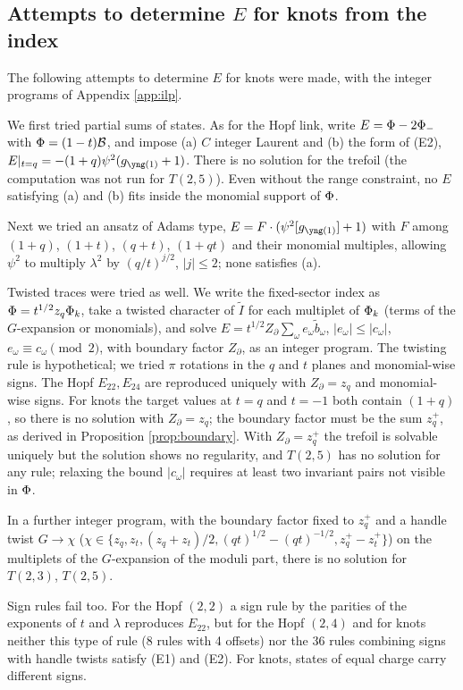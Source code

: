 \subsection{Attempts to determine \texorpdfstring{$E$}{E} for knots from the index}\label{app:attempts}
\begin{result}[negative]\label{cr:EC}
The following attempts to determine $E$ for knots were made, with the integer programs of Appendix \ref{app:ilp}.

We first tried partial sums of states. As for the Hopf link, write $E = \Phi - 2\Phi_-$ with $\Phi = (1-t)\mathcal{B}$, and impose (a) $C$ integer Laurent and (b) the form of (E2), $E|_{t=q} = -(1+q)\psi^2(g_{\yone} + 1)$. There is no solution for the trefoil (the computation was not run for $T(2,5)$). Even without the range constraint, no $E$ satisfying (a) and (b) fits inside the monomial support of $\Phi$.

Next we tried an ansatz of Adams type, $E = F\cdot(\psi^2[g_{\yone}] + 1)$ with $F$ among $(1+q)$, $(1+t)$, $(q+t)$, $(1+qt)$ and their monomial multiples, allowing $\psi^2$ to multiply $\lambda^2$ by $(q/t)^{j/2}$, $|j| \le 2$; none satisfies (a).

Twisted traces were tried as well. We write the fixed-sector index as $\Phi = t^{1/2} z_q \Phi_k$, take a twisted character of $\tilde I$ for each multiplet of $\Phi_k$ (terms of the $G$-expansion or monomials), and solve $E = t^{1/2}Z_\partial\sum_\omega e_\omega\tilde b_\omega$, $|e_\omega| \le |c_\omega|$, $e_\omega \equiv c_\omega \pmod 2$, with boundary factor $Z_\partial$, as an integer program. The twisting rule is hypothetical; we tried $\pi$ rotations in the $q$ and $t$ planes and monomial-wise signs. The Hopf $E_{22}, E_{24}$ are reproduced uniquely with $Z_\partial = z_q$ and monomial-wise signs. For knots the target values at $t = q$ and $t = -1$ both contain $(1+q)$, so there is no solution with $Z_\partial = z_q$; the boundary factor must be the sum $z_q^+$, as derived in Proposition \ref{prop:boundary}. With $Z_\partial = z_q^+$ the trefoil is solvable uniquely but the solution shows no regularity, and $T(2,5)$ has no solution for any rule; relaxing the bound $|c_\omega|$ requires at least two invariant pairs not visible in $\Phi$.

In a further integer program, with the boundary factor fixed to $z_q^+$ and a handle twist $G\to \chi$ ($\chi\in\{z_q, z_t, (z_q+z_t)/2, (qt)^{1/2}-(qt)^{-1/2}, z_q^+-z_t^+\}$) on the multiplets of the $G$-expansion of the moduli part, there is no solution for $T(2,3)$, $T(2,5)$.

Sign rules fail too. For the Hopf $(2,2)$ a sign rule by the parities of the exponents of $t$ and $\lambda$ reproduces $E_{22}$, but for the Hopf $(2,4)$ and for knots neither this type of rule (8 rules with 4 offsets) nor the 36 rules combining signs with handle twists satisfy (E1) and (E2). For knots, states of equal charge carry different signs.
\end{result}

